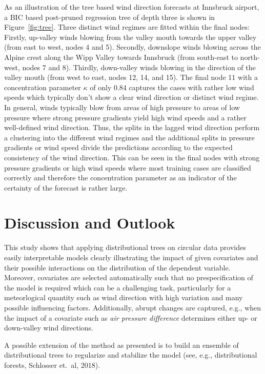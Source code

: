 \documentclass[twoside]{report}
\begin{document}
As an illustration of the tree based wind direction forecasts at Innsbruck
airport, a BIC based post-pruned regression tree of depth three is shown in
Figure~\ref{fig:tree}. Three distinct wind regimes are fitted within the final
nodes: Firstly, up-valley winds blowing from the valley mouth towards the upper
valley (from east to west, nodes 4 and 5). Secondly, downslope winds blowing
across the Alpine crest along the Wipp Valley towards Innsbruck (from
south-east to north-west, nodes 7 and 8). Thirdly, down-valley winds blowing
in the direction of the valley mouth (from west to east, nodes 12, 14, and 15).
The final node 11 with a concentration parameter $\kappa$ of only $0.84$
captures the cases with rather low wind speeds which typically don't show a
clear wind direction or distinct wind regime. In general, winds typically blow
from areas of high pressure to areas of low pressure where strong pressure
gradients yield high wind speeds and a rather well-defined wind direction.
Thus, the splits in the lagged wind direction perform a clustering into the
different wind regimes and the additional splits in pressure gradients or wind
speed divide the predictions according to the expected consistency of the wind
direction. This can be seen in the final nodes with strong pressure gradients
or high wind speeds where most training cases are classified correctly and
therefore the concentration parameter as an indicator of the certainty of the
forecast is rather large. 

\section{Discussion and Outlook}
This study shows that applying distributional trees on circular data provides easily 
interpretable models clearly illustrating the impact of given covariates and their possible 
interactions on the distribution of the dependent variable. 
Moreover, covariates are selected automatically such that no prespecification of the model is 
required which can be a challenging task, particularly for a meteorlogical quantity such as wind 
direction with high variation and many possible influencing factors.
Additionally, abrupt changes are captured, e.g., when the impact of a covariate such as 
\textit{air pressure difference} determines either up- or down-valley wind directions.

A possible extension of the method as presented is to build an ensemble of 
distributional trees to regularize and stabilize the model 
(see, e.g., distributional forests, Schlosser et.~al, 2018). 
\end{document}

